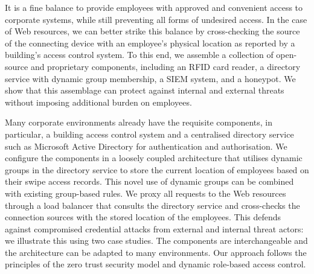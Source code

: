It is a fine balance to provide employees with approved and convenient
access to corporate systems, while still preventing all forms of
undesired access.  In the case of Web resources, we can better strike
this balance by cross-checking the source of the connecting device
with an employee's physical location as reported by a building's
access control system.  To this end, we assemble a collection of
open-source and proprietary components, including an RFID card reader,
a directory service with dynamic group membership, a SIEM system, and
a honeypot.  We show that this assemblage can protect against internal
and external threats without imposing additional burden on employees.

Many corporate environments already have the requisite components, in
particular, a building access control system and a centralised
directory service such as Microsoft Active Directory for
authentication and authorisation.  We configure the components in a
loosely coupled architecture that utilises dynamic groups in the
directory service to store the current location of employees based on
their swipe access records.  This novel use of dynamic groups can be
combined with existing group-based rules.  We proxy all requests to
the Web resources through a load balancer that consults the directory
service and cross-checks the connection sources with the stored
location of the employees.  This defends against compromised
credential attacks from external and internal threat actors: we
illustrate this using two case studies.  The components are
interchangeable and the architecture can be adapted to many
environments.  Our approach follows the principles of the zero trust
security model and dynamic role-based access control.
